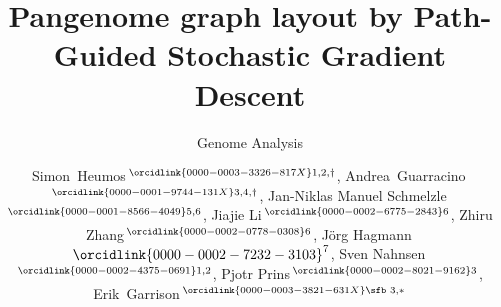 \documentclass{bioinfo}
\theoremstyle{definition}
\begin{document}

    \subtitle{Genome Analysis}

    \title[Pangenome graph layout by Path-Guided Stochastic Gradient Descent]{Pangenome graph layout by Path-Guided Stochastic Gradient Descent}
    
	\author[Heumos, Guarracino \textit{et~al}.]{
        Simon~Heumos\,$^{\orcidlink{0000-0003-3326-817X}1,2,\dagger}$,
        Andrea~Guarracino\,$^{\orcidlink{0000-0001-9744-131X}3,4,\dagger}$,
        Jan-Niklas Manuel Schmelzle\,$^{\orcidlink{0000-0001-8566-4049}5,6}$,
        Jiajie Li\,$^{\orcidlink{0000-0002-6775-2843}6}$,
        Zhiru Zhang\,$^{\orcidlink{0000-0002-0778-0308}6}$,
        Jörg Hagmann\,${\orcidlink{0000-0002-7232-3103}^7}$,
        Sven Nahnsen\,$^{\orcidlink{0000-0002-4375-0691}1,2}$,
        Pjotr Prins\,$^{\orcidlink{0000-0002-8021-9162}3}$,
        Erik~Garrison\,$^{\orcidlink{0000-0003-3821-631X}\text{\sfb 3},*}$
    }

    \address{
        $^1$Quantitative Biology Center (QBiC), University of Tübingen, Tübingen 72076, Germany \\
        $^2$Biomedical Data Science, Department of Computer Science, University of Tübingen, Tübingen 72076, Germany \\
        $^3$Department of Genetics, Genomics and Informatics, University of Tennessee Health Science Center, Memphis, TN 38163, USA \\
        $^4$Genomics Research Centre, Human Technopole, Milan 20157, Italy \\
        $^5$Department of Computer Engineering, School of Computation, Information and Technology (CIT), Technical University of Munich, Munich 80333, Germany \\
        $^6$School of Electrical and Computer Engineering, Cornell University, Ithaca, NY 14853, USA \\
        $^7$Computomics GmbH, Eisenbahnstr. 1, 72072 Tübingen, Germany \\
    }
\end{document}
